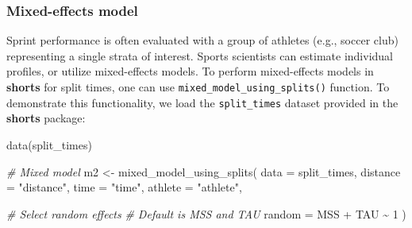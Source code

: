 \documentclass[fleqn,10pt,lineno]{wlpeerj} %
\newenvironment{Shaded}{\begin{snugshade}}{\end{snugshade}}
\newcommand{\AttributeTok}[1]{\textcolor[rgb]{0.77,0.63,0.00}{#1}}
\newcommand{\CommentTok}[1]{\textcolor[rgb]{0.56,0.35,0.01}{\textit{#1}}}
\newcommand{\DecValTok}[1]{\textcolor[rgb]{0.00,0.00,0.81}{#1}}
\newcommand{\FunctionTok}[1]{\textcolor[rgb]{0.00,0.00,0.00}{#1}}
\newcommand{\NormalTok}[1]{#1}
\newcommand{\OtherTok}[1]{\textcolor[rgb]{0.56,0.35,0.01}{#1}}
\newcommand{\SpecialCharTok}[1]{\textcolor[rgb]{0.00,0.00,0.00}{#1}}
\newcommand{\StringTok}[1]{\textcolor[rgb]{0.31,0.60,0.02}{#1}}
\begin{document}
\hypertarget{mixed-effects-model}{%
\subsubsection{Mixed-effects model}\label{mixed-effects-model}}

Sprint performance is often evaluated with a group of athletes (e.g., soccer club) representing a single strata of interest. Sports scientists can estimate individual profiles, or utilize mixed-effects models. To perform mixed-effects models in \textbf{shorts} for split times, one can use \texttt{mixed\_model\_using\_splits()} function. To demonstrate this functionality, we load the \texttt{split\_times} dataset provided in the \textbf{shorts} package:

\begin{Shaded}
\begin{Highlighting}[]
\FunctionTok{data}\NormalTok{(split\_times)}

\CommentTok{\# Mixed model}
\NormalTok{m2 }\OtherTok{\textless{}{-}} \FunctionTok{mixed\_model\_using\_splits}\NormalTok{(}
  \AttributeTok{data =}\NormalTok{ split\_times,}
  \AttributeTok{distance =} \StringTok{"distance"}\NormalTok{,}
  \AttributeTok{time =} \StringTok{"time"}\NormalTok{,}
  \AttributeTok{athlete =} \StringTok{"athlete"}\NormalTok{,}

  \CommentTok{\# Select random effects}
  \CommentTok{\# Default is MSS and TAU}
  \AttributeTok{random =}\NormalTok{ MSS }\SpecialCharTok{+}\NormalTok{ TAU }\SpecialCharTok{\textasciitilde{}} \DecValTok{1}
\NormalTok{)}


\end{Highlighting}
\end{Shaded}
\end{document}
